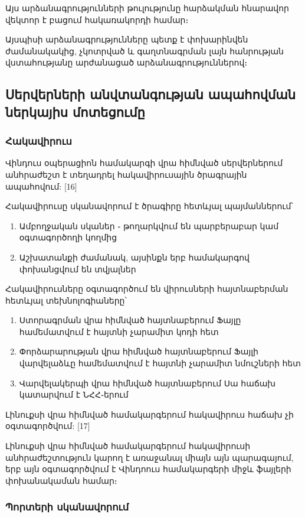 \documentclass[11pt]{article}
\begin{document}
\begin{sloppypar}
\begin{enumerate}
    Այս արձանագրությունների թուլությունը հարձակման հնարավոր
    վեկտոր է բացում հակառակորդի համար։

    Այսպիսի արձանագրությունները պետք է փոխարինվեն ժամանակակից,
    չկոտրված և գաղտնագրման լայն հանրության վստահությանը արժանացած
    արձանագրություններով։
\end{enumerate}


\subsection{Սերվերների անվտանգության ապահովման ներկայիս մոտեցումը}


\subsubsection{Հակավիրուս}

Վինդուս օպերացիոն համակարգի վրա հիմնված սերվերներում անհրաժեշտ է տեղադրել
հակավիրուսային ծրագրային ապահովում: [16]

Հակավիրուսը սկանավորում է ծրագիրը հետևյալ պայմաններում՝
\begin{enumerate}
    \item Ամբողջական սկաներ ֊ թողարկվում են պարբերաբար կամ օգտագործողի կողմից
    \item Աշխատանքի ժամանակ, այսինքն երբ համակարգով փոխանցվում են տվյալներ
\end{enumerate}

Հակավիրուսները օգտագործում են վիրուսների հայտնաբերման հետևյալ տեխնոլոգիաները՝

\begin{enumerate}
\item Ստորագրման վրա հիմնված հայտնաբերում
    Ֆայլը համեմատվում է հայտնի չարամիտ կոդի հետ
\item Փորձարարության վրա հիմնված հայտնաբերում
    Ֆայլի վարվելաձևը համեմատվում է հայտնի չարամիտ
    նմուշների հետ
\item Վարվելակերպի վրա հիմնված հայտնաբերում
    Սա հաճախ կատարվում է ՆՀՀ֊երում
\end{enumerate}

Լինուքսի վրա հիմնված համակարգերում հակավիրուս հաճախ չի օգտագործվում: [17]

Լինուքսի վրա հիմնված համակարգերում հակավիրուսի անհրաժեշտություն կարող է
առաջանալ միայն այն պարագայում, երբ այն օգտագործվում է Վինդոուս համակարգերի
միջև ֆայլերի փոխանակաման համար։

\subsubsection{Պորտերի սկանավորում}


\end{sloppypar}
\end{document}

